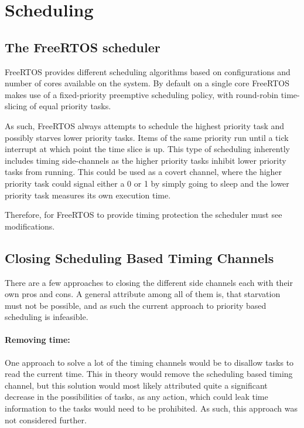 \section{Scheduling}\label{sec:Scheduling} %

\subsection{The FreeRTOS scheduler} %
FreeRTOS provides different scheduling algorithms based on configurations and
number of cores available on the system. By default on a single core FreeRTOS
makes use of a fixed-priority preemptive scheduling policy, with round-robin
time-slicing of equal priority tasks. \cite{FreeRTOSschedulingsinglecore2026}

As such, FreeRTOS always attempts to schedule the highest priority task and
possibly starves lower priority tasks. Items of the same priority run until a
tick interrupt at which point the time slice is up. This type of scheduling
inherently includes timing side-channels as the higher priority tasks inhibit
lower priority tasks from running. \cite{kadloor2016, chen2019} This could be
used as a covert channel, where the higher priority task could signal either a
0 or 1 by simply going to sleep and the lower priority task measures its own
execution time.

Therefore, for FreeRTOS to provide timing protection the scheduler must see
modifications.

\subsection{Closing Scheduling Based Timing Channels}

There are a few approaches to closing the different side channels each with
their own pros and cons. A general attribute among all of them is, that
starvation must not be possible, and as such the current approach to priority
based scheduling is infeasible. 

\paragraph{Removing time:} One approach to solve a lot of the timing channels
would be to disallow tasks to read the current time. This in theory would
remove the scheduling based timing channel, but this solution would most likely
attributed quite a significant decrease in the possibilities of tasks, as any
action, which could leak time information to the tasks would need to be
prohibited. As such, this approach was not considered further.


